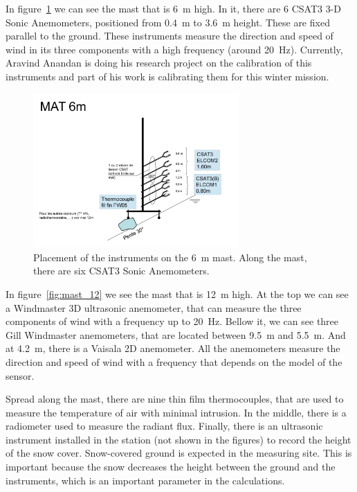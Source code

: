 In figure~\ref{fig:mast_6} we can see the mast that is 6~m high. In it, there are 6 CSAT3 3-D Sonic Anemometers, positioned from 0.4~m to 3.6~m height. These are fixed parallel to the ground. These instruments measure the direction and speed of wind in its three components with a high frequency (around 20~Hz). Currently, Aravind Anandan is doing his research project on the calibration of this instruments and part of his work is calibrating them for this winter mission.

\begin{figure}[!ht]
  \begin{center}
  \includegraphics[width=0.7\textwidth]{fig/0001.jpg}
  \caption{Placement of the instruments on the 6~m mast. Along the mast, there are six CSAT3 Sonic Anemometers.}
  \label{fig:mast_6}
  \end{center}
\end{figure}

In figure~\ref{fig:mast_12} we see the mast that is 12~m high. At the top we can see a Windmaster 3D ultrasonic anemometer, that can measure the three components of wind with a frequency up to 20~Hz. Bellow it, we can see three Gill Windmaster anemometers, that are located between 9.5~m and 5.5~m. And at 4.2~m, there is a Vaisala 2D anemometer.  All the anemometers measure the direction and speed of wind with a frequency that depends on the model of the sensor. 

Spread along the mast, there are nine thin film thermocouples, that are used to measure the temperature of air with minimal intrusion. In the middle, there is a radiometer used to measure the radiant flux. Finally, there is an ultrasonic instrument installed in the station (not shown in the figures) to record the height of the snow cover. Snow-covered ground is expected in the measuring site. This is important because the snow decreases the height between the ground and the instruments, which is an important parameter in the calculations.

